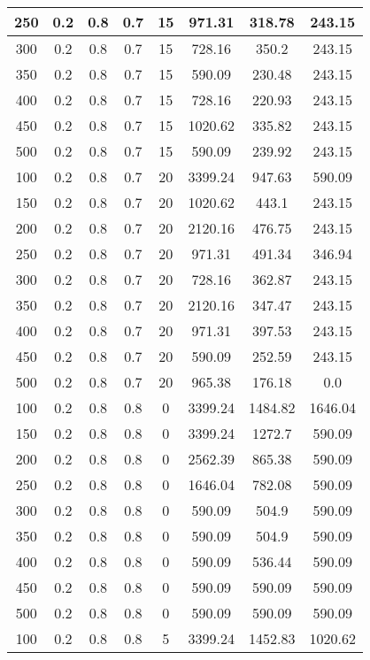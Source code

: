 \documentclass[a4paper, 12pt]{extreport}
\begin{document}
\begin{itemize}
\begin{longtable}{|c|c|c|c|c|c|c|c|}
			250 & 0.2 & 0.8 & 0.7 & 15 & 971.31 & 318.78 & 243.15 \\\hline
			300 & 0.2 & 0.8 & 0.7 & 15 & 728.16 & 350.2 & 243.15 \\\hline
			350 & 0.2 & 0.8 & 0.7 & 15 & 590.09 & 230.48 & 243.15 \\\hline
			400 & 0.2 & 0.8 & 0.7 & 15 & 728.16 & 220.93 & 243.15 \\\hline
			450 & 0.2 & 0.8 & 0.7 & 15 & 1020.62 & 335.82 & 243.15 \\\hline
			500 & 0.2 & 0.8 & 0.7 & 15 & 590.09 & 239.92 & 243.15 \\\hline
			100 & 0.2 & 0.8 & 0.7 & 20 & 3399.24 & 947.63 & 590.09 \\\hline
			150 & 0.2 & 0.8 & 0.7 & 20 & 1020.62 & 443.1 & 243.15 \\\hline
			200 & 0.2 & 0.8 & 0.7 & 20 & 2120.16 & 476.75 & 243.15 \\\hline
			250 & 0.2 & 0.8 & 0.7 & 20 & 971.31 & 491.34 & 346.94 \\\hline
			300 & 0.2 & 0.8 & 0.7 & 20 & 728.16 & 362.87 & 243.15 \\\hline
			350 & 0.2 & 0.8 & 0.7 & 20 & 2120.16 & 347.47 & 243.15 \\\hline
			400 & 0.2 & 0.8 & 0.7 & 20 & 971.31 & 397.53 & 243.15 \\\hline
			450 & 0.2 & 0.8 & 0.7 & 20 & 590.09 & 252.59 & 243.15 \\\hline
			500 & 0.2 & 0.8 & 0.7 & 20 & 965.38 & 176.18 & 0.0 \\\hline
			100 & 0.2 & 0.8 & 0.8 & 0 & 3399.24 & 1484.82 & 1646.04 \\\hline
			150 & 0.2 & 0.8 & 0.8 & 0 & 3399.24 & 1272.7 & 590.09 \\\hline
			200 & 0.2 & 0.8 & 0.8 & 0 & 2562.39 & 865.38 & 590.09 \\\hline
			250 & 0.2 & 0.8 & 0.8 & 0 & 1646.04 & 782.08 & 590.09 \\\hline
			300 & 0.2 & 0.8 & 0.8 & 0 & 590.09 & 504.9 & 590.09 \\\hline
			350 & 0.2 & 0.8 & 0.8 & 0 & 590.09 & 504.9 & 590.09 \\\hline
			400 & 0.2 & 0.8 & 0.8 & 0 & 590.09 & 536.44 & 590.09 \\\hline
			450 & 0.2 & 0.8 & 0.8 & 0 & 590.09 & 590.09 & 590.09 \\\hline
			500 & 0.2 & 0.8 & 0.8 & 0 & 590.09 & 590.09 & 590.09 \\\hline
			100 & 0.2 & 0.8 & 0.8 & 5 & 3399.24 & 1452.83 & 1020.62 \\\hline

\end{longtable}
\end{itemize}
\end{document}
